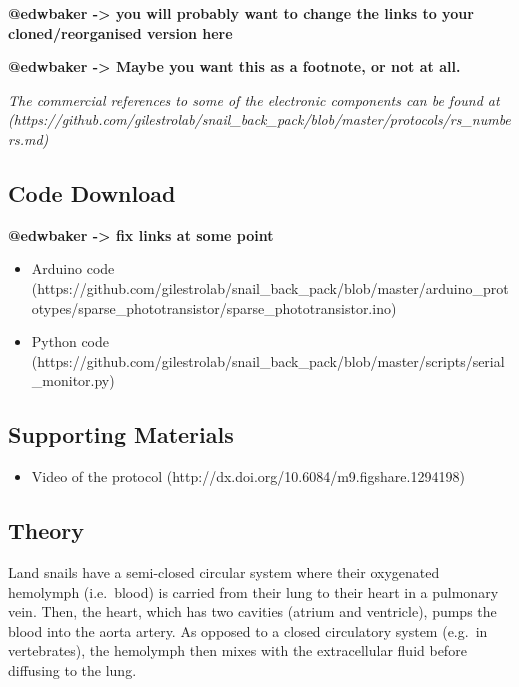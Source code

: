 \documentclass[]{article}
\begin{document}
\textbf{@edwbaker -\textgreater{} you will probably want to change the
links to your cloned/reorganised version here}

\textbf{@edwbaker -\textgreater{} Maybe you want this as a footnote, or
not at all.}

\emph{The commercial references to some of the electronic components can
be found at
(https://github.com/gilestrolab/snail\_back\_pack/blob/master/protocols/rs\_numbers.md)}

\subsection{Code Download}\label{code-download}

\textbf{@edwbaker -\textgreater{} fix links at some point}

\begin{itemize}
\itemsep1pt\parskip0pt
\item
  Arduino code
  (https://github.com/gilestrolab/snail\_back\_pack/blob/master/arduino\_prototypes/sparse\_phototransistor/sparse\_phototransistor.ino)
\item
  Python code
  (https://github.com/gilestrolab/snail\_back\_pack/blob/master/scripts/serial\_monitor.py)
\end{itemize}

\subsection{Supporting Materials}\label{supporting-materials}

\begin{itemize}
\itemsep1pt\parskip0pt
\item
  Video of the protocol (http://dx.doi.org/10.6084/m9.figshare.1294198)
\end{itemize}

\subsection{Theory}\label{theory}

Land snails have a semi-closed circular system where their oxygenated
hemolymph (i.e.~blood) is carried from their lung to their heart in a
pulmonary vein. Then, the heart, which has two cavities (atrium and
ventricle), pumps the blood into the aorta artery. As opposed to a
closed circulatory system (e.g.~in vertebrates), the hemolymph then
mixes with the extracellular fluid before diffusing to the lung.
\end{document}
